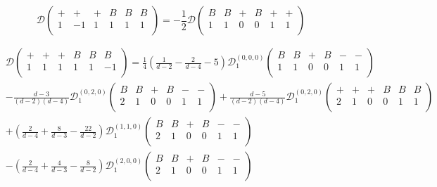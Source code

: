 \begin{equation}
\mathcal{D}
\begin{pmatrix}
+ & + & + & B & B & B \\
1 & -1 & 1 & 1 & 1 & 1  \\
\end{pmatrix} = 
-\frac{1}{2}\mathcal{D}
\begin{pmatrix}
B & B & + & B & + & + \\
1 & 1 & 0 & 0 & 1 & 1  \\
\end{pmatrix}
\end{equation}

\begin{equation}
\begin{split}
&\mathcal{D}
\begin{pmatrix}
+ & + & + & B & B & B \\
1 & 1 & 1 & 1 & 1 & -1  \\
\end{pmatrix} = 
\frac{1}{4}\left(\frac{1}{d-2}-\frac{2}{d-4}-5\right)\mathcal{D}_1^{(0,0,0)}
\begin{pmatrix}
B & B & + & B & - & - \\
1 & 1 & 0 & 0 & 1 & 1  \\
\end{pmatrix} \\
&-\frac{d-3}{(d-2)(d-4)}\mathcal{D}_1^{(0,2,0)}
\begin{pmatrix}
B & B & + & B & - & - \\
2 & 1 & 0 & 0 & 1 & 1  \\
\end{pmatrix} 
+\frac{d-5}{(d-2)(d-4)}\mathcal{D}_1^{(0,2,0)}
\begin{pmatrix}
+ & + & + & B & B & B \\
2 & 1 & 0 & 0 & 1 & 1  \\
\end{pmatrix} \\
&+\left(\frac{2}{d-4}+\frac{8}{d-3}-\frac{22}{d-2}\right)\mathcal{D}_1^{(1,1,0)}
\begin{pmatrix}
B & B & + & B & - & - \\
2 & 1 & 0 & 0 & 1 & 1  \\
\end{pmatrix} \\
&-\left(\frac{2}{d-4}+\frac{4}{d-3}-\frac{8}{d-2}\right)\mathcal{D}_1^{(2,0,0)}
\begin{pmatrix}
B & B & + & B & - & - \\
2 & 1 & 0 & 0 & 1 & 1  \\

\end{pmatrix}
\end{split}
\end{equation}
